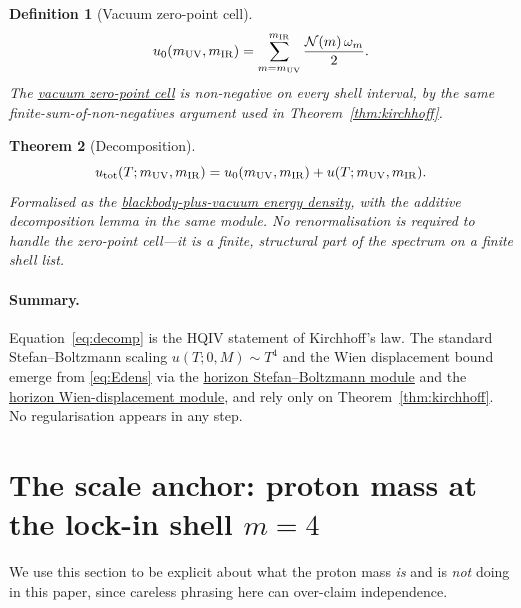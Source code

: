 \documentclass[11pt]{amsart}
\newtheorem{definition}{Definition}[section]
\newtheorem{theorem}[definition]{Theorem}
\begin{document}
\begin{definition}[Vacuum zero-point cell]\label{def:zp}
\begin{equation}\label{eq:zp}
  u_{0}(m_{\rm UV},m_{\rm IR})
   =\sum_{m=m_{\rm UV}}^{m_{\rm IR}}
    \frac{\mathcal{N}(m)\,\omega_m}{2}.
\end{equation}
The
\hyperref[lean:vacuum-zp]{vacuum zero-point cell} is non-negative
on every shell interval, by the same finite-sum-of-non-negatives
argument used in Theorem~\ref{thm:kirchhoff}.
\end{definition}

\begin{theorem}[Decomposition]\label{thm:decomp}
\begin{equation}\label{eq:decomp}
  u_{\rm tot}(T;m_{\rm UV},m_{\rm IR})
   =u_{0}(m_{\rm UV},m_{\rm IR})
   +u(T;m_{\rm UV},m_{\rm IR}).
\end{equation}
Formalised as the
\hyperref[lean:blackbody-with-vacuum]{blackbody-plus-vacuum
energy density}, with the additive decomposition lemma in the
same module.  No renormalisation is required to handle the
zero-point cell---it is a finite, structural part of the spectrum
on a finite shell list.
\end{theorem}

\paragraph{Summary.}
Equation~\eqref{eq:decomp} is the HQIV statement of Kirchhoff's
law.  The standard Stefan--Boltzmann scaling $u(T;0,M)\sim T^{4}$
and the Wien displacement bound emerge from \eqref{eq:Edens} via
the
\hyperref[lean:stefan]{horizon Stefan--Boltzmann module} and the
\hyperref[lean:wien]{horizon Wien-displacement module}, and rely
only on Theorem~\ref{thm:kirchhoff}.  No regularisation appears
in any step.

\section{The scale anchor: proton mass at the lock-in shell
$m=4$}\label{sec:proton}

We use this section to be explicit about what the proton mass
\emph{is} and is \emph{not} doing in this paper, since careless
phrasing here can over-claim independence.
\end{document}
